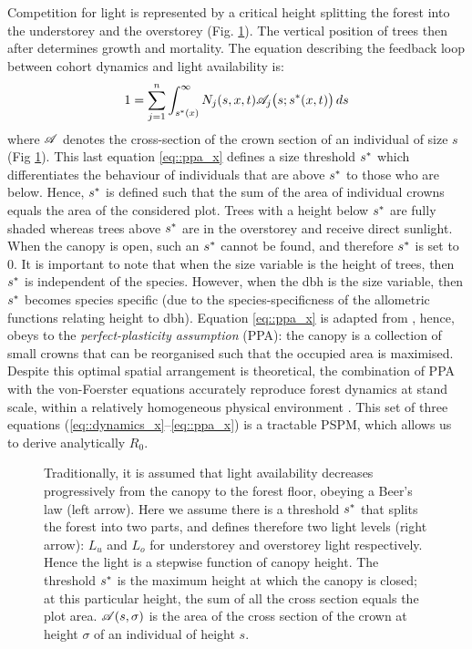 Competition for light is represented by a critical height splitting the forest into the understorey and the overstorey (Fig. \ref{fig::ppa}). The vertical position of trees then after determines growth and mortality. The equation describing the feedback loop between cohort dynamics and light availability is:
\begin{equation}
	1 = \sum_{j = 1}^{n} \int_{{s}^{*}(x)}^{\infty} N_j(s, x, t) \mathscr{A}_j \big(s; {s}^{*}(x, t)\big) \, ds \label{eq::ppa_x}
\end{equation}
where $ \mathscr{A} $ denotes the cross-section of the crown section of an individual of size $ s $ (Fig \ref{fig::ppa}). This last equation \eqref{eq::ppa_x} defines a size threshold $ {s}^{*} $ which differentiates the behaviour of individuals that are above $ {s}^{*} $ to those who are below. Hence, $ {s}^{*} $ is defined such that the sum of the area of individual crowns equals the area of the considered plot. Trees with a height below $ {s}^{*} $ are fully shaded whereas trees above $ {s}^{*} $ are in the overstorey and receive direct sunlight. When the canopy is open, such an $ {s}^{*} $ cannot be found, and therefore $ {s}^{*} $ is set to $ 0 $. It is important to note that when the size variable is the height of trees, then $ {s}^{*} $ is independent of the species. However, when the dbh is the size variable, then $ {s}^{*} $ becomes species specific (due to the species-specificness of the allometric functions relating height to dbh). Equation \eqref{eq::ppa_x} is adapted from \citet{Strigul2008}, hence, obeys to the \textit{perfect-plasticity assumption} (PPA): the canopy is a collection of small crowns that can be reorganised such that the occupied area is maximised. Despite this optimal spatial arrangement is theoretical, the combination of PPA with the von-Foerster equations accurately reproduce forest dynamics at stand scale, within a relatively homogeneous physical environment \citep{Strigul2008, Purves2008}. This set of three equations (\ref{eq::dynamics_x}--\ref{eq::ppa_x}) is a tractable PSPM, which allows us to derive analytically $ R_0 $.

\begin{figure}
	\centering
	
	\caption{Traditionally, it is assumed that light availability decreases progressively from the canopy to the forest floor, obeying a Beer's law (left arrow). Here we assume there is a threshold $ {s}^{*} $ that splits the forest into two parts, and defines therefore two light levels (right arrow): $ L_u $ and $ L_o $ for understorey and overstorey light respectively. Hence the light is a stepwise function of canopy height. The threshold $ {s}^{*} $ is the maximum height at which the canopy is closed; at this particular height, the sum of all the cross section equals the plot area. $ \mathscr{A}(s, \sigma) $ is the area of the cross section of the crown at height $ \sigma $ of an individual of height $ s $. \label{fig::ppa}}
\end{figure}

